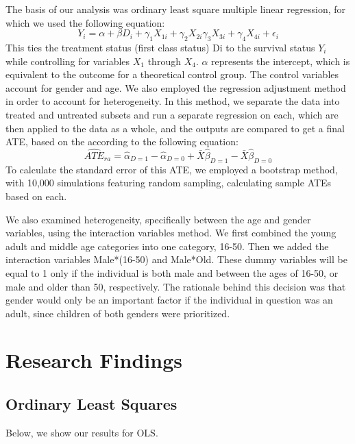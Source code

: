 \documentclass[12pt]{article}
\begin{document}
The basis of our analysis was ordinary least square multiple linear regression, for which we used the following equation:
$$Y_i = \alpha + \beta D_i + \gamma_1 X_{1i} + \gamma_2 X_{2i}
\gamma_3 X_{3i} + \gamma_4 X_{4i} + \epsilon_i $$
This ties the treatment status (first class status) Di to the survival status $Y_i$ while controlling for variables $X_1$ through $X_4$. $\alpha$ represents the intercept, which is equivalent to the outcome for a theoretical control group. The control variables account for gender and age. 
We also employed the regression adjustment method in order to account for heterogeneity. In this method, we separate the data into treated and untreated subsets and run a separate regression on each, which are then applied to the data as a whole, and the outputs are compared to get a final ATE, based on the according to the following equation:
$$\widehat{ATE}_{ra} = \hat{\alpha}_{D=1} - \hat{\alpha}_{D=0} + 
\bar{X}\hat{\beta}_{D=1}- \bar{X}\hat{\beta}_{D=0}$$
To calculate the standard error of this ATE, we employed a bootstrap method, with 10,000 simulations featuring random sampling, calculating sample ATEs based on each.

We also examined heterogeneity, specifically between the age and gender variables, using the interaction variables method. We first combined the young adult and middle age categories into one category, 16-50. Then we added the interaction variables Male*(16-50) and Male*Old. These dummy variables will be equal to 1 only if the individual is both male and between the ages of 16-50, or male and older than 50, respectively. The rationale behind this decision was that gender would only be an important factor if the individual in question was an adult, since children of both genders were prioritized. 

\section{Research Findings}
\subsection{Ordinary Least Squares}
\doublespacing
Below, we show our results for OLS.
\end{document}
